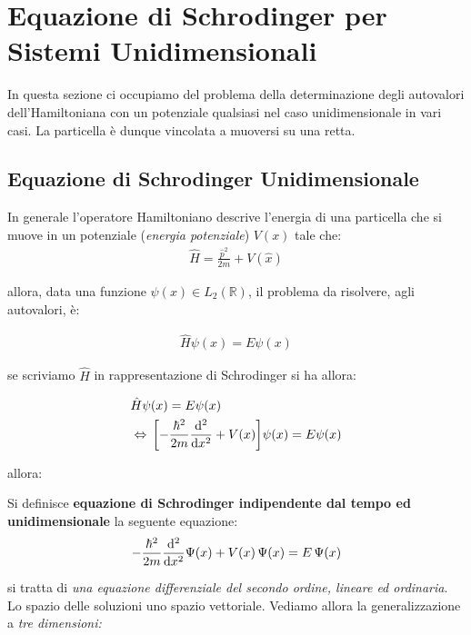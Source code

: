 \chapter{Equazione di Schrodinger per Sistemi Unidimensionali}

	In questa sezione ci occupiamo del problema della determinazione degli autovalori dell'Hamiltoniana con un potenziale qualsiasi nel caso unidimensionale in vari casi. La particella è dunque vincolata a muoversi su una retta.
	
\section{Equazione di Schrodinger Unidimensionale}

\begin{nb}
	In generale l'operatore Hamiltoniano descrive l'energia di una particella che si muove in un potenziale (\textit{energia potenziale}) $V(x)$ tale che:
\begin{align*}
	\hat{H} = \frac{\hat{p}^2}{2m} + V(\hat{x})
\end{align*}
\end{nb}

	allora, data una funzione $\psi(x) \in L_2(\mathbb{R})$, il problema da risolvere, agli autovalori, è:
	
\begin{align*}
	\hat{H}\psi(x) = E \psi(x)
\end{align*}

	se scriviamo $\hat{H}$ in rappresentazione di Schrodinger si ha allora:

\begin{align*}
	& \hat{H}\psi(x) = E \psi(x) \\
	& \Leftrightarrow \, \qty[-\frac{\hbar^2}{2m} \dv[2]{x} + V(x) ] \psi(x) = E \psi(x) 
\end{align*}

	allora:
	
\begin{mydef}
	Si definisce \textbf{equazione di Schrodinger indipendente dal tempo ed unidimensionale} la seguente equazione:
\begin{align*}
	-\frac{\hbar^2}{2m} \dv[2]{x} \Psi(x) + V(x) \, \Psi(x) = E \, \Psi(x)
\end{align*}
\end{mydef}

	si tratta di \textit{una equazione differenziale del secondo ordine, lineare ed ordinaria}. Lo spazio delle soluzioni uno spazio vettoriale. Vediamo allora la generalizzazione a \textit{tre dimensioni:}
	
